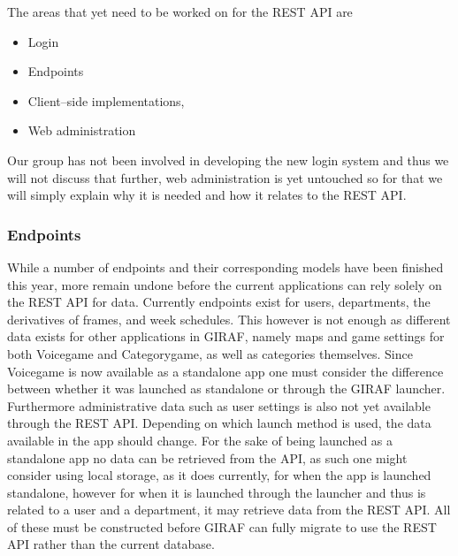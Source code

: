 The areas that yet need to be worked on for the REST API are
\begin{itemize}
\item Login
\item Endpoints
\item Client--side implementations,
\item Web administration
\end{itemize}
Our group has not been involved in developing the new login system and thus we will not discuss that further, web administration is yet untouched so for that we will simply explain why it is needed and how it relates to the REST API.

\subsubsection*{Endpoints}
While a number of endpoints and their corresponding models have been finished this year, more remain undone before the current applications can rely solely on the REST API for data.
Currently endpoints exist for users, departments, the derivatives of frames, and week schedules.
This however is not enough as different data exists for other applications in GIRAF, namely maps and game settings for both Voicegame and Categorygame, as well as categories themselves.
Since Voicegame is now available as a standalone app one must consider the difference between whether it was launched as standalone or through the GIRAF launcher.
Furthermore administrative data such as user settings is also not yet available through the REST API.
Depending on which launch method is used, the data available in the app should change.
For the sake of being launched as a standalone app no data can be retrieved from the API, as such one might consider using local storage, as it does currently, for when the app is launched standalone, however for when it is launched through the launcher and thus is related to a user and a department, it may retrieve data from the REST API.
All of these must be constructed before GIRAF can fully migrate to use the REST API rather than the current database.

